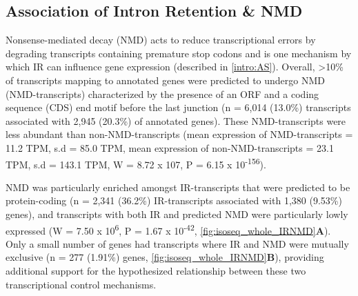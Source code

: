 \subsection{Association of Intron Retention \& NMD}
\label{ch4: IR}
Nonsense-mediated decay (NMD) acts to reduce transcriptional errors by degrading transcripts containing premature stop codons\cite{Hug2015} and is one mechanism by which IR can influence gene expression\cite{Pan2006} (described in \cref{intro:AS}). Overall, >10\% of transcripts mapping to annotated genes were predicted to undergo NMD (NMD-transcripts) characterized by the presence of an ORF and a coding sequence (CDS) end motif before the last junction (n = 6,014 (13.0\%) transcripts associated with 2,945 (20.3\%) of annotated genes). These NMD-transcripts were less abundant than non-NMD-transcripts (mean expression of NMD-transcripts = 11.2 TPM, s.d =  85.0 TPM, mean expression of non-NMD-transcripts = 23.1 TPM, s.d = 143.1 TPM, W = 8.72 x 107, P = 6.15 x 10\textsuperscript{-156}).  

NMD was particularly enriched amongst IR-transcripts that were predicted to be protein-coding (n = 2,341 (36.2\%) IR-transcripts associated with 1,380 (9.53\%) genes), and transcripts with both IR and predicted NMD were particularly lowly expressed (W = 7.50 x 10\textsuperscript{6}, P = 1.67 x 10\textsuperscript{-42}, \cref{fig:isoseq_whole_IRNMD}\textbf{A}). Only a small number of genes had transcripts where IR and NMD were mutually exclusive (n = 277 (1.91\%) genes, \cref{fig:isoseq_whole_IRNMD}\textbf{B}), providing additional support for the hypothesized relationship between these two transcriptional control mechanisms\cite{Ge2014}. 



